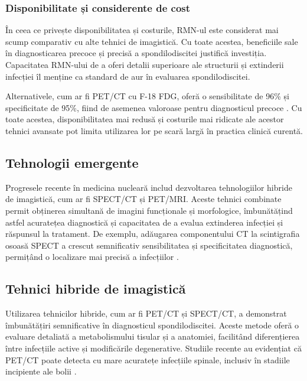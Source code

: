 \message{ !name(LaMain.tex)}\documentclass[romanian,12pt,a4paper]{article}
\begin{document}
\subsubsection{Disponibilitate și considerente de cost}

În ceea ce privește disponibilitatea și costurile, RMN-ul este
considerat mai scump comparativ cu alte tehnici de imagistică. Cu toate
acestea, beneficiile sale în diagnosticarea precoce și precisă a
spondilodiscitei justifică investiția. Capacitatea RMN-ului de a oferi
detalii superioare ale structurii și extinderii infecției îl menține ca
standard de aur în evaluarea spondilodiscitei.

Alternativele, cum ar fi PET/CT cu F-18 FDG, oferă o sensibilitate de
96\% și specificitate de 95\%, fiind de asemenea valoroase pentru
diagnosticul precoce \cite{ComparisonDiagnosticValue2017}. Cu toate
acestea, disponibilitatea mai redusă și costurile mai ridicate ale
acestor tehnici avansate pot limita utilizarea lor pe scară largă în
practica clinică curentă.

\subsection{Tehnologii emergente}

Progresele recente în medicina nucleară includ dezvoltarea tehnologiilor
hibride de imagistică, cum ar fi SPECT/CT și PET/MRI. Aceste tehnici
combinate permit obținerea simultană de imagini funcționale și
morfologice, îmbunătățind astfel acuratețea diagnostică și capacitatea
de a evalua extinderea infecției și răspunsul la tratament. De exemplu,
adăugarea componentului CT la scintigrafia osoasă SPECT a crescut
semnificativ sensibilitatea și specificitatea diagnostică, permițând o
localizare mai precisă a infecțiilor
\cite{RadionuclideImagingMusculoskeletal2016}\cite{RoleNuclearMedicine2012}.

\subsection{Tehnici hibride de imagistică}

Utilizarea tehnicilor hibride, cum ar fi PET/CT și SPECT/CT, a
demonstrat îmbunătățiri semnificative în diagnosticul spondilodiscitei.
Aceste metode oferă o evaluare detaliată a metabolismului tisular și a
anatomiei, facilitând diferențierea între infecțiile active și
modificările degenerative. Studiile recente au evidențiat că PET/CT
poate detecta cu mare acuratețe infecțiile spinale, inclusiv în stadiile
incipiente ale bolii
\cite{RadionuclideImagingMusculoskeletal2016}\cite{ImagingAssessmentSpine2024}.
\pagebreak
\end{document}
